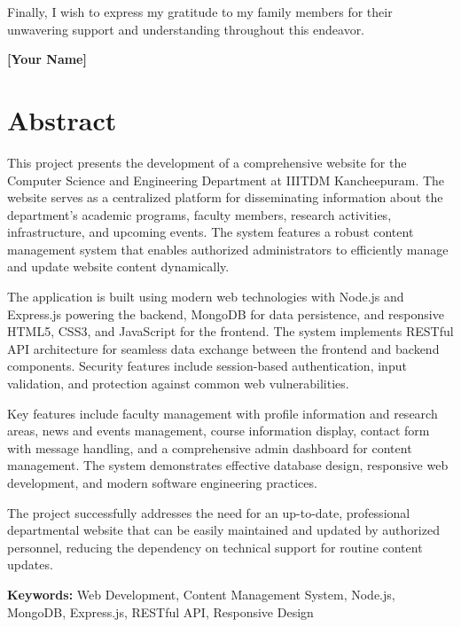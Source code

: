 \documentclass[12pt,a4paper]{report}
\begin{document}
Finally, I wish to express my gratitude to my family members for their unwavering support and understanding throughout this endeavor.

\vspace{1cm}
\begin{flushright}
\textbf{[Your Name]}
\end{flushright}

\chapter*{Abstract}

This project presents the development of a comprehensive website for the Computer Science and Engineering Department at IIITDM Kancheepuram. The website serves as a centralized platform for disseminating information about the department's academic programs, faculty members, research activities, infrastructure, and upcoming events. The system features a robust content management system that enables authorized administrators to efficiently manage and update website content dynamically.

The application is built using modern web technologies with Node.js and Express.js powering the backend, MongoDB for data persistence, and responsive HTML5, CSS3, and JavaScript for the frontend. The system implements RESTful API architecture for seamless data exchange between the frontend and backend components. Security features include session-based authentication, input validation, and protection against common web vulnerabilities.

Key features include faculty management with profile information and research areas, news and events management, course information display, contact form with message handling, and a comprehensive admin dashboard for content management. The system demonstrates effective database design, responsive web development, and modern software engineering practices.

The project successfully addresses the need for an up-to-date, professional departmental website that can be easily maintained and updated by authorized personnel, reducing the dependency on technical support for routine content updates.

\textbf{Keywords:} Web Development, Content Management System, Node.js, MongoDB, Express.js, RESTful API, Responsive Design

\tableofcontents
{}
\end{document}
